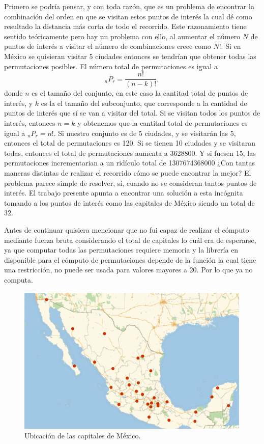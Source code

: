 Primero se podría pensar, y con toda razón, que es un problema de encontrar la combinación del orden en que se visitan estos puntos de interés la cual dé como resultado la distancia más corta de todo el recorrido. Este razonamiento tiene sentido teóricamente pero hay un problema con ello, al aumentar el número $N$ de puntos de interés a visitar el número de combinaciones crece como $N!$. Si en México se quisieran visitar 5 ciudades entonces se tendrían que obtener todas las permutaciones posibles. El número total de permutaciones es igual a
\begin{equation*}
    _{n}{P}_{r} = \frac{n!}{(n - k)!} ,
\end{equation*}
donde $n$ es el tamaño del conjunto, en este caso la cantitad total de puntos de interés, y $k$ es la el tamaño del subconjunto, que corresponde a la cantidad de puntos de interés que sí se van a visitar del total. Si se visitan todos los puntos de interés, entonces $n = k$ y obtenemos que la cantitad total de permutaciones es igual a $_{n}P_{r} = n!$. Si nuestro conjunto es de 5 ciudades, y se visitarán las 5, entonces el total de permutaciones es 120. Si se tienen 10 ciudades y se visitaran todas, entonces el total de permutaciones aumenta a 3628800. Y si fuesen 15, las permutaciones incrementarian a un ridículo total de 1307674368000 ¿Con tantas maneras distintas de realizar el recorrido cómo se puede encontrar la mejor? El problema parece simple de resolver, sí, cuando no se consideran tantos puntos de interés. El trabajo presente apunta a encontrar una solución a esta incógnita tomando a los puntos de interés como las capitales de México siendo un total de 32.

Antes de continuar quisiera mencionar que no fui capaz de realizar el cómputo mediante fuerza bruta considerando el total de capitales lo cuál era de esperarse, ya que computar todas las permutaciones requiere memoria y la librería en  disponible para el cómputo de permutaciones depende de la función  la cual tiene una restricción, no puede ser usada para valores mayores a 20. Por lo que  ya no computa.

\begin{figure}[ht!]
    \centering
    \includegraphics[scale=0.8]{../figures/capital_locations.pdf}
    \caption{Ubicación de las capitales de México.}
    \label{fig:capitales_mexico}
\end{figure}

